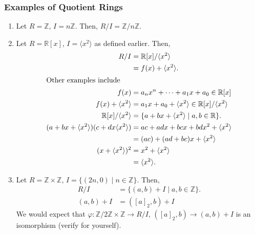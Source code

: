 \documentclass[8pt]{extarticle}
\newcommand{\Z}{\mathbb{Z}}
\newcommand{\R}{\mathbb{R}}
\begin{document}
  \subsubsection{Examples of Quotient Rings}%
  \begin{enumerate}[(1)]
    \item Let $R = \Z$, $I = n\Z$. Then, $R/I = \Z/n\Z$.
    \item Let $R = \R[x]$, $I = \langle x^2\rangle$ as defined earlier. Then,
      \begin{align*}
        R/I &= \R[x]/\langle x^2\rangle\\
            &= f(x) + \langle x^2 \rangle.\\
            \shortintertext{Other examples include}
        f(x) &= a_nx^n + \cdots + a_1x + a_0 \in \R[x]\\
        f(x) + \langle x^2 \rangle &= a_1 x + a_0 + \langle x^2 \rangle \in \R[x]/\langle x^2\rangle\\
        \R[x]/\langle x^2\rangle &= \{a+bx + \langle x^2 \rangle\mid a,b\in\R\}.\\
        (a+bx + \langle x^2 \rangle)(c + dx \langle x^2 \rangle) &= ac + ad x + bc x + bdx^2 + \langle x^2 \rangle\\
                                                                 &= (ac) + (ad + bc) x + \langle x^2 \rangle\\
        (x+\langle x^2\rangle)^2 &= x^2 + \langle x^2 \rangle\\
                                 &= \langle x^2 \rangle.
      \end{align*}
    \item Let $R = \Z\times\Z$, $I = \{(2n,0)\mid n\in\Z\}$. Then,
      \begin{align*}
        R/I &= \{(a,b) + I\mid a,b\in\Z\}.\\
        (a,b) + I &= ([a]_2,b) + I \tag*{where $[a]_2$ is $a$ modulo 2.}
      \end{align*}
      We would expect that $\varphi: \Z/2\Z\times \Z \rightarrow R/I$, $([a]_2,b)\rightarrow (a,b) + I$ is an isomorphism (verify for yourself).
  \end{enumerate}
\end{document}
